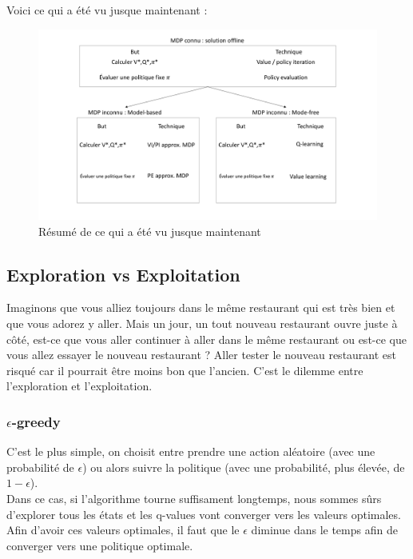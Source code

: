 \begin{remark}
    Voici ce qui a été vu jusque maintenant :
    \begin{figure}[H]
        \centering
        \includegraphics[width=\linewidth]{pictures/resume_offline_RL.pdf}
        \caption{Résumé de ce qui a été vu jusque maintenant}
        \label{fig:rl_summary}
    \end{figure}
\end{remark}

\subsection{Exploration vs Exploitation} %
\label{sub:exploration_vs_exploitation}
\begin{example}
    Imaginons que vous alliez toujours dans le même restaurant qui est très bien et que vous adorez y aller. Mais un jour,
    un tout nouveau restaurant ouvre juste à côté, est-ce que vous aller continuer à aller dans le même restaurant ou est-ce
    que vous allez essayer le nouveau restaurant ? Aller tester le nouveau restaurant est risqué car il pourrait être moins
    bon que l'ancien. C'est le dilemme entre l'exploration et l'exploitation.
\end{example}

\subsubsection{$\epsilon$-greedy} %
C'est le plus simple, on choisit entre prendre une action aléatoire (avec une probabilité de \textbf{$\epsilon$}) ou alors 
suivre la politique (avec une probabilité, plus élevée, de \textbf{$1-\epsilon$}).\\
Dans ce cas, si l'algorithme tourne suffisament longtemps, nous sommes sûrs d'explorer tous les états et les q-values vont
converger vers les valeurs optimales. Afin d'avoir ces valeurs optimales, il faut que le $\epsilon$ diminue dans le temps afin
de converger vers une politique optimale.
 

